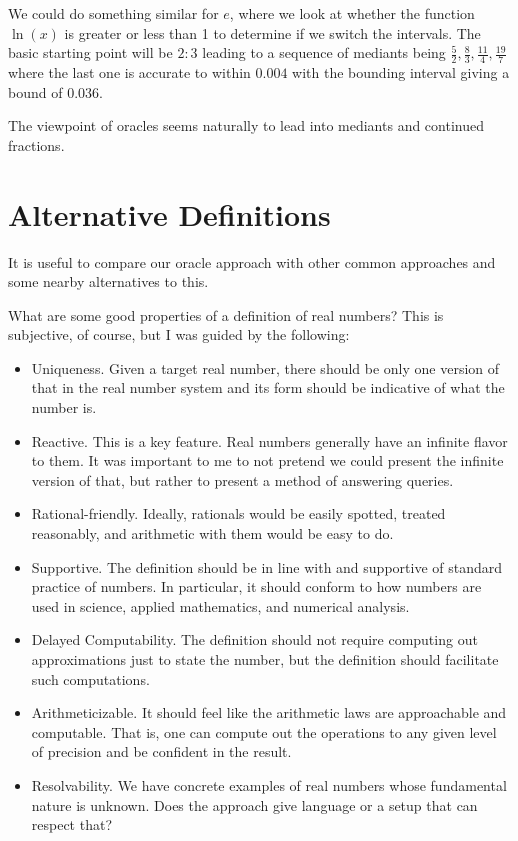 \documentclass[12pt]{article}
\begin{document}
We could do something similar for $e$, where we look at whether the function $\ln(x)$ is greater or less than 1 to determine if we switch the intervals. The basic starting point will be $2:3$ leading to a sequence of mediants being $\frac{5}{2}, \frac{8}{3}, \frac{11}{4}, \frac{19}{7}$ where the last one is accurate to within $0.004$ with the bounding interval giving a bound of $0.036$. 

The viewpoint of oracles seems naturally to lead into mediants and continued fractions. 


\section{Alternative Definitions}\label{sec:others}

It is useful to compare our oracle approach with other common approaches and some nearby alternatives to this. 

What are some good properties of a definition of real numbers? This is subjective, of course, but I was guided by the following: 

\begin{itemize}
    \item Uniqueness. Given a target real number, there should be only one version of that in the real number system and its form should be indicative of what the number is. 
    \item Reactive. This is a key feature. Real numbers generally have an infinite flavor to them. It was important to me to not pretend we could present the infinite version of that, but rather to present a method of answering queries. 
    \item Rational-friendly. Ideally, rationals would be easily spotted, treated reasonably, and arithmetic with them would be easy to do. 
    \item Supportive. The definition should be in line with and supportive of standard practice of numbers. In particular, it should conform to how numbers are used in science, applied mathematics, and numerical analysis. 
    \item Delayed Computability. The definition should not require computing out approximations just to  state the number, but the definition should facilitate such computations. 
    \item Arithmeticizable. It should feel like the arithmetic laws are approachable and computable. That is, one can compute out the operations to any given level of precision and be confident in the result.
    \item Resolvability. We have concrete examples of real numbers whose fundamental nature is unknown. Does the approach give language or a setup that can respect that? 
\end{itemize}
\end{document}
